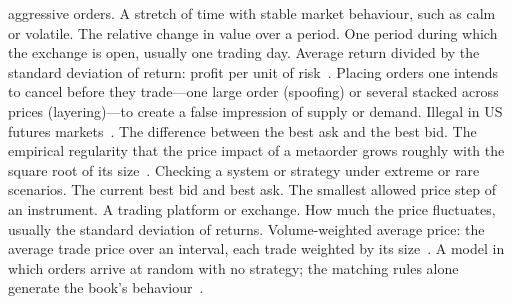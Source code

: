 \begin{description}[leftmargin=1.2em,style=sameline,itemsep=1pt,font=\normalfont\bfseries]
  aggressive orders.
 A stretch of time with stable market behaviour, such as calm or volatile.
 The relative change in value over a period.
 One period during which the exchange is open, usually one trading day.
 Average return divided by the standard deviation of return: profit per unit of
  risk~\citep{sharpe1966,sharpe1994}.
 Placing orders one intends to cancel before they trade---one large order
  (spoofing) or several stacked across prices (layering)---to create a false impression of supply
  or demand. Illegal in US futures markets~\citep{cftc2013spoofing}.
 The difference between the best ask and the best bid.
 The empirical regularity that the price impact of a metaorder grows roughly with the square root of its size~\citep{bouchaud2018}.
 Checking a system or strategy under extreme or rare scenarios.
 The current best bid and best ask.
 The smallest allowed price step of an instrument.
 A trading platform or exchange.
 How much the price fluctuates, usually the standard deviation of returns.
 Volume-weighted average price: the average trade price over an interval, each trade
  weighted by its size~\citep{harris2003}.
 A model in which orders arrive at random with no strategy; the matching rules alone generate the book's behaviour~\citep{smith2003}.
\end{description}

